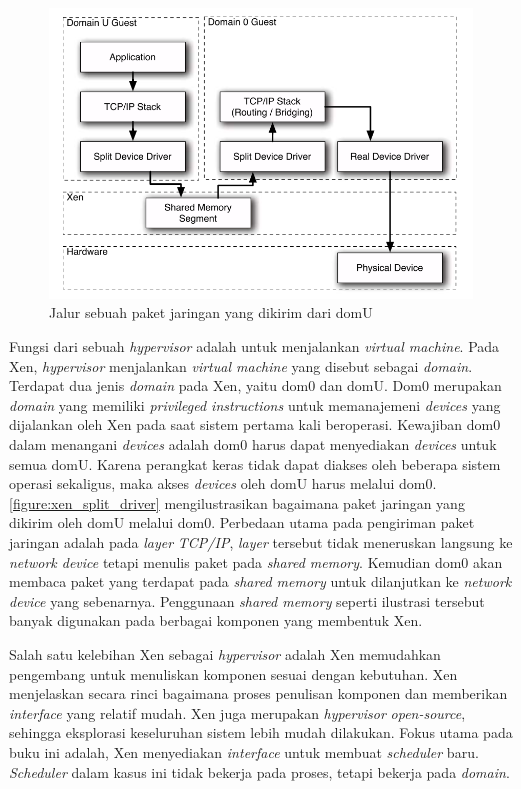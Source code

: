 \begin{figure}[h]
    \includegraphics[scale=0.5]{./resources/xen-split-driver.png}
    \caption[Jalur sebuah paket jaringan yang dikirim dari domU]{Jalur sebuah paket jaringan yang dikirim dari domU \citep{Chisnall2014}}
    \label{figure:xen_split_driver}
\end{figure}

Fungsi dari sebuah \textit{hypervisor} adalah untuk menjalankan \textit{virtual machine}.  Pada
Xen, \textit{hypervisor} menjalankan \textit{virtual machine} yang disebut sebagai
\textit{domain}.  Terdapat dua jenis \textit{domain} pada Xen, yaitu dom0 dan domU.  Dom0
merupakan \textit{domain} yang memiliki \textit{privileged instructions} untuk memanajemeni
\textit{devices} yang dijalankan oleh Xen pada saat sistem pertama kali beroperasi.  Kewajiban
dom0 dalam menangani \textit{devices} adalah dom0 harus dapat menyediakan \textit{devices} untuk
semua domU.  Karena perangkat keras tidak dapat diakses oleh beberapa sistem operasi sekaligus,
maka akses \textit{devices} oleh domU harus melalui dom0.  \autoref{figure:xen_split_driver}
mengilustrasikan bagaimana paket jaringan yang dikirim oleh domU melalui dom0.  Perbedaan utama
pada pengiriman paket jaringan adalah pada \textit{layer} \textit{TCP/IP}, \textit{layer}
tersebut tidak meneruskan langsung ke \textit{network device} tetapi menulis paket pada
\textit{shared memory}.  Kemudian dom0 akan membaca paket yang terdapat pada \textit{shared
memory} untuk dilanjutkan ke \textit{network device} yang sebenarnya.  Penggunaan \textit{shared
memory} seperti ilustrasi tersebut banyak digunakan pada berbagai komponen yang membentuk Xen.

Salah satu kelebihan Xen sebagai \textit{hypervisor} adalah Xen memudahkan pengembang untuk
menuliskan komponen sesuai dengan kebutuhan.  Xen menjelaskan secara rinci bagaimana proses
penulisan komponen dan memberikan \textit{interface} yang relatif mudah.  Xen juga merupakan
\textit{hypervisor} \textit{open-source}, sehingga eksplorasi keseluruhan sistem lebih mudah
dilakukan.  Fokus utama pada buku ini adalah, Xen menyediakan \textit{interface} untuk membuat
\textit{scheduler} baru.  \textit{Scheduler} dalam kasus ini tidak bekerja pada proses,
tetapi bekerja pada \textit{domain}.

